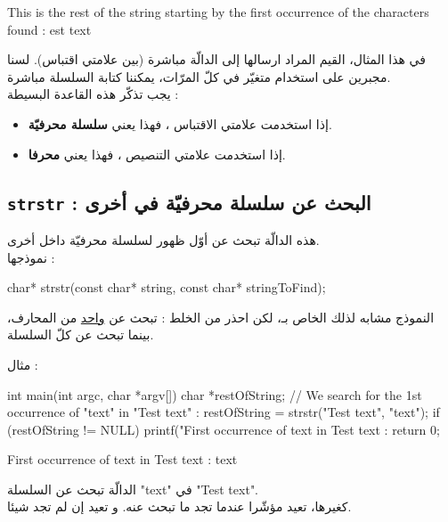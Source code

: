\begin{Console}
This is the rest of the string starting by the first occurrence of the characters found : est text
\end{Console}

في هذا المثال، القيم المراد ارسالها إلى الدالّة مباشرة (بين علامتي اقتباس). لسنا مجبرين على استخدام متغيّر في كلّ المرّات، يمكننا كتابة السلسلة مباشرة.\\
يجب تذكّر هذه القاعدة البسيطة :

\begin{itemize}
  \item إذا استخدمت علامتي الاقتباس ، فهذا يعني \textbf{سلسلة محرفيّة}.
  \item إذا استخدمت علامتي التنصيص ، فهذا يعني \textbf{محرفا}.
\end{itemize}

\subsection{\texttt{strstr} : البحث عن سلسلة محرفيّة في أخرى}

هذه الدالّة تبحث عن أوّل ظهور لسلسلة محرفيّة داخل أخرى.\\
نموذجها :

\begin{Csource}
char* strstr(const char* string, const char* stringToFind);
\end{Csource}

النموذج مشابه لذلك الخاص بـ،
لكن احذر من الخلط :
تبحث عن
\underline{واحد}
من المحارف، بينما
تبحث عن كلّ السلسلة.

مثال :

\begin{Csource}
int main(int argc, char *argv[])
{
	char *restOfString;
	// We search for the 1st occurrence of "text" in "Test text" :
	restOfString = strstr("Test text", "text");
	if (restOfString != NULL)
	 {
    		printf("First occurrence of text in Test text : %
	}
	return 0;
}
\end{Csource}

\begin{Console}
First occurrence of text in Test text : text
\end{Console}

الدالّة
تبحث عن السلسلة
"\textenglish{text}"
في
"\textenglish{Test text}".\\
كغيرها، تعيد مؤشّرا عندما تجد ما تبحث عنه. و تعيد
إن لم تجد شيئا.

